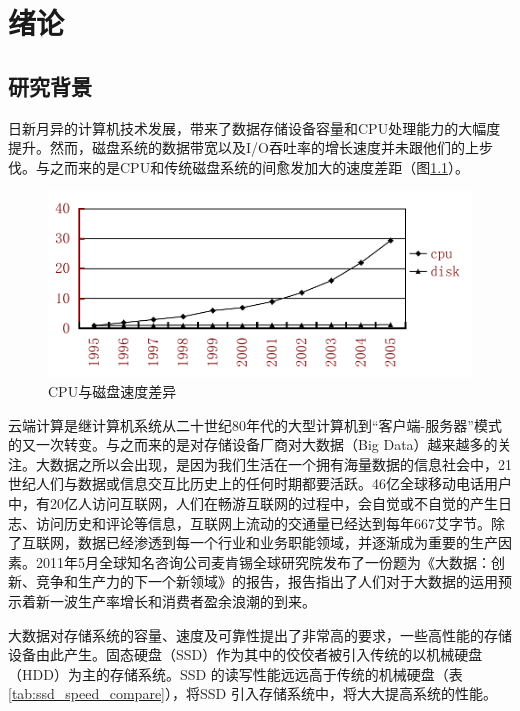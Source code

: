 
\chapter{绪论}
\label{cha:introduction}

\section{研究背景}
\label{sec:background}

日新月异的计算机技术发展，带来了数据存储设备容量和CPU处理能力的大幅度提升。然而，磁盘系统的数据带宽以及I/O吞吐率的增长速度并未跟他们的上步伐。与之而来的是CPU和传统磁盘系统的间愈发加大的速度差距（图\ref{fig:cpu_disk_diff}）。

\begin{figure}[h]\label{fig:cpu_disk_diff}
\centering
\includegraphics[width=0.7\linewidth]{./graph/cpu-disk-gap}
\caption{CPU与磁盘速度差异}
\label{fig:cpu_disk_diff}
\end{figure}

云端计算是继计算机系统从二十世纪80年代的大型计算机到“客户端-服务器”模式的又一次转变。与之而来的是对存储设备厂商对大数据（Big Data）越来越多的关注。大数据之所以会出现，是因为我们生活在一个拥有海量数据的信息社会中，21世纪人们与数据或信息交互比历史上的任何时期都要活跃。46亿全球移动电话用户中，有20亿人访问互联网，人们在畅游互联网的过程中，会自觉或不自觉的产生日志、访问历史和评论等信息，互联网上流动的交通量已经达到每年667艾字节。除了互联网，数据已经渗透到每一个行业和业务职能领域，并逐渐成为重要的生产因素。2011年5月全球知名咨询公司麦肯锡全球研究院发布了一份题为《大数据：创新、竞争和生产力的下一个新领域》的报告，报告指出了人们对于大数据的运用预示着新一波生产率增长和消费者盈余浪潮的到来。

大数据对存储系统的容量、速度及可靠性提出了非常高的要求，一些高性能的存储设备由此产生。固态硬盘（SSD）作为其中的佼佼者被引入传统的以机械硬盘（HDD）为主的存储系统。SSD 的读写性能远远高于传统的机械硬盘（表\ref{tab:ssd_speed_compare}），将SSD 引入存储系统中，将大大提高系统的性能。

